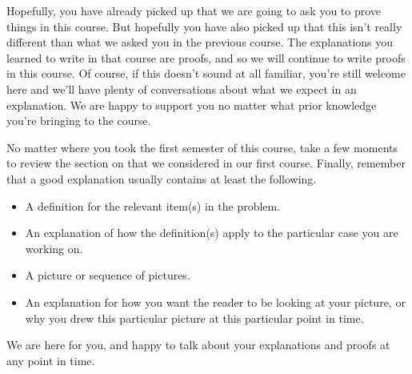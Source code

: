 \documentclass{ximera}
\begin{document}
Hopefully, you have already picked up that we are going to ask you to prove things in this course. But hopefully you have also picked up that this isn't really different than what we asked you in the previous course. The explanations you learned to write in that course are proofs, and so we will continue to write proofs in this course. Of course, if this doesn't sound at all familiar, you're still welcome here and we'll have plenty of conversations about what we expect in an explanation. We are happy to support you no matter what prior knowledge you're bringing to the course.

No matter where you took the first semester of this course, take a few moments to review the section on  that we considered in our first course. Finally, remember that a good explanation usually contains at least the following.

\begin{itemize}
	\item A definition for the relevant item(s) in the problem.
	\item An explanation of how the definition(s) apply to the particular case you are working on.
	\item A picture or sequence of pictures.
	\item An explanation for how you want the reader to be looking at your picture, or why you drew this particular picture at this particular point in time.
\end{itemize}

We are here for you, and happy to talk about your explanations and proofs at any point in time.
\end{document}
